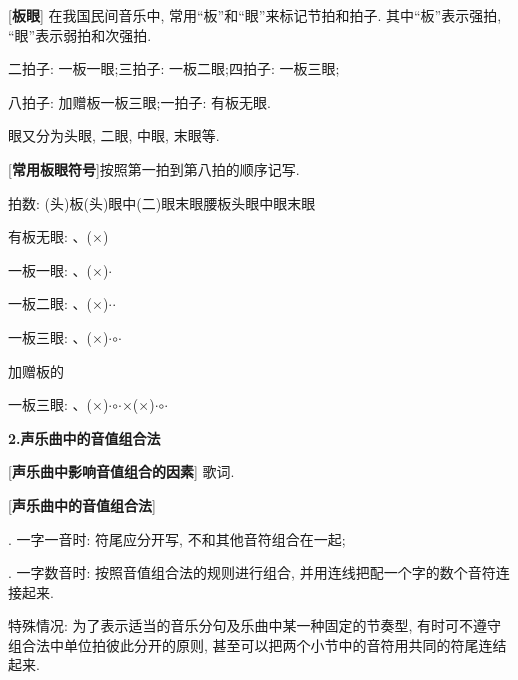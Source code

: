 [\textbf{板眼}] 在我国民间音乐中, 常用``板''和``眼''来标记节拍和拍子. 其中``板''表示强拍, ``眼''表示弱拍和次强拍.\par
\qquad 二拍子: 一板一眼;\qquad 三拍子: 一板二眼;\qquad 四拍子: 一板三眼;\par
\qquad 八拍子: 加赠板一板三眼;\qquad 一拍子: 有板无眼.\par
\qquad 眼又分为头眼, 二眼, 中眼, 末眼等.\par

\clearpage

[\textbf{常用板眼符号}]按照第一拍到第八拍的顺序记写.\par
\qquad 拍\qquad 数: \quad (头)板\quad (头)眼\quad 中(二)眼\quad 末眼\quad 腰板\quad 头眼\quad 中眼\quad 末眼\par
\qquad 有板无眼: \quad 、($\times$)\par
\qquad 一板一眼: \quad 、($\times$)\qquad $\cdot$\par
\qquad 一板二眼: \quad 、($\times$)\qquad $\cdot$\qquad $\cdot$\par
\qquad 一板三眼: \quad 、($\times$)\qquad $\cdot$\qquad $\circ$\qquad $\cdot$\par
\qquad 加赠板的\par
\qquad 一板三眼: \quad 、($\times$)\qquad $\cdot$\qquad $\circ$\qquad $\cdot$\qquad $\times$($\times$)\qquad $\cdot$\qquad $\circ$\qquad $\cdot$\par

\begin{center}
 \textbf{2.声乐曲中的音值组合法}\\
\end{center}

[\textbf{声乐曲中影响音值组合的因素}] 歌词.\par

[\textbf{声乐曲中的音值组合法}]\par
{}. 一字一音时: 符尾应分开写, 不和其他音符组合在一起;\par
{}. 一字数音时: 按照音值组合法的规则进行组合, 并用连线把配一个字的数个音符连接起来.\par
\qquad 特殊情况: 为了表示适当的音乐分句及乐曲中某一种固定的节奏型, 有时可不遵守组合法中单位拍彼此分开的原则, 甚至可以把两个小节中的音符用共同的符尾连结起来.\par


